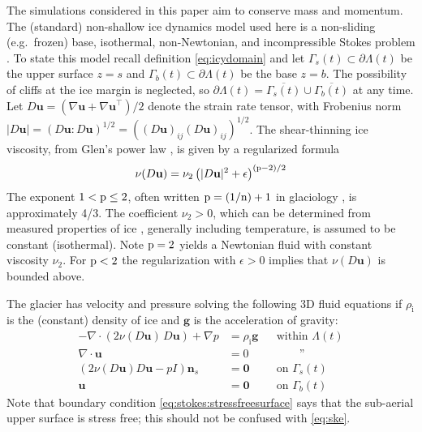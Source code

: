 \documentclass[hidelinks,onefignum,onetabnum,final]{siamart220329}  %
\newcommand{\eps}{\epsilon}
\newcommand{\grad}{\nabla}
\newcommand{\bg}{\mathbf{g}}
\newcommand{\bn}{\mathbf{n}}
\newcommand{\bu}{\mathbf{u}}
\newcommand{\bzero}{\bm{0}}
\newcommand{\nn}{{\text{\textnormal{n}}}}
\newcommand{\pp}{{\text{\textnormal{p}}}}
\newcommand{\rhoi}{\rho_{\text{i}}}
\begin{document}
The simulations considered in this paper aim to conserve mass and momentum.   The (standard) non-shallow ice dynamics model used here is a non-sliding (e.g.~frozen) base, isothermal, non-Newtonian, and incompressible Stokes problem \cite{GreveBlatter2009,JouvetRappaz2011,SchoofHewitt2013}.  To state this model recall definition \eqref{eq:icydomain} and let $\Gamma_s(t) \subset \partial \Lambda(t)$ be the upper surface $z=s$ and $\Gamma_b(t) \subset \partial \Lambda(t)$ be the base $z=b$.  The possibility of cliffs at the ice margin is neglected, so $\partial \Lambda(t) = \overline{\Gamma_s(t)} \cup \overline{\Gamma_b(t)}$ at any time.  Let $D\bu=(\grad \bu + \grad \bu^{\top})/2$ denote the strain rate tensor, with Frobenius norm $|D\bu| = (D\bu:D\bu)^{1/2} = \left((D\bu)_{ij} (D\bu)_{ij}\right)^{1/2}$.  The shear-thinning ice viscosity, from Glen's power law \cite{GreveBlatter2009}, is given by a regularized formula
\begin{equation}
\nu(D\bu) = \nu_2 \left(|D\bu|^2 + \eps\right)^{(\pp-2)/2} \label{eq:glen}
\end{equation}
The exponent $1 < \pp \le 2$, often written $\pp=(1/\nn)+1$ in glaciology \cite{GoldsbyKohlstedt2001}, is approximately 4/3.  The coefficient $\nu_2>0$, which can be determined from measured properties of ice \cite{GreveBlatter2009}, generally including temperature, is assumed to be constant (isothermal).  Note $\pp=2$ yields a Newtonian fluid with constant viscosity $\nu_2$.  For $\pp < 2$ the regularization with $\eps>0$ implies that $\nu(D\bu)$ is bounded above.

The glacier has velocity and pressure solving the following 3D fluid equations if $\rhoi$ is the (constant) density of ice and $\bg$ is the acceleration of gravity:
\begin{subequations}
\label{eq:stokes}
\begin{align}
- \nabla \cdot \left(2 \nu(D\bu)\, D\bu\right) + \nabla p &= \rhoi \bg && \text{within $\Lambda(t)$} \\
\nabla \cdot \bu &= 0 && \qquad \text{''} \label{eq:stokes:incomp} \\
\left(2 \nu(D\bu) D\bu - pI\right) \bn_s &= \bzero && \text{on $\Gamma_s(t)$}\label{eq:stokes:stressfreesurface} \\
\bu  &= \bzero && \text{on $\Gamma_b(t)$}
\end{align}
\end{subequations}
Note that boundary condition \eqref{eq:stokes:stressfreesurface} says that the sub-aerial upper surface is stress free; this should not be confused with \eqref{eq:ske}.
\end{document}
